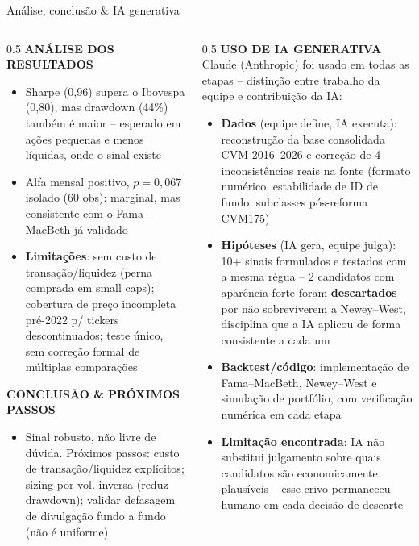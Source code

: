 \documentclass[aspectratio=169,9pt]{beamer}
\let\olditem\item
\renewcommand\item{\olditem\vspace{0.5pt}}
\newcommand{\crit}[1]{{\scriptsize\color{gold}\textbf{#1}}}
\begin{document}
\begin{frame}{Análise, conclusão \& IA generativa}{}
\begin{columns}[T]
\begin{column}{0.5\textwidth}
\crit{ANÁLISE DOS RESULTADOS}
\begin{itemize}
\item Sharpe (0,96) supera o Ibovespa (0,80), mas drawdown (44\%) também é
  maior -- esperado em ações pequenas e menos líquidas, onde o sinal existe
\item Alfa mensal positivo, $p=0{,}067$ isolado (60 obs): marginal, mas
  consistente com o Fama--MacBeth já validado
\item \textbf{Limitações}: sem custo de transação/liquidez (perna comprada em
  small caps); cobertura de preço incompleta pré-2022 p/ tickers
  descontinuados; teste único, sem correção formal de múltiplas comparações
\end{itemize}
\crit{CONCLUSÃO \& PRÓXIMOS PASSOS}
\begin{itemize}
\item Sinal robusto, não livre de dúvida. Próximos passos: custo de
  transação/liquidez explícitos; sizing por vol. inversa (reduz drawdown);
  validar defasagem de divulgação fundo a fundo (não é uniforme)
\end{itemize}
\end{column}
\begin{column}{0.5\textwidth}
\crit{USO DE IA GENERATIVA}\\[2pt]
\footnotesize Claude (Anthropic) foi usado em todas as etapas -- distinção
entre trabalho da equipe e contribuição da IA:
\begin{itemize}
\item \textbf{Dados} (equipe define, IA executa): reconstrução da base
  consolidada CVM 2016--2026 e correção de 4 inconsistências reais na fonte
  (formato numérico, estabilidade de ID de fundo, subclasses pós-reforma
  CVM175)
\item \textbf{Hipóteses} (IA gera, equipe julga): 10+ sinais formulados e
  testados com a mesma régua -- 2 candidatos com aparência forte foram
  \textbf{descartados} por não sobreviverem a Newey--West, disciplina que a
  IA aplicou de forma consistente a cada um
\item \textbf{Backtest/código}: implementação de Fama--MacBeth, Newey--West
  e simulação de portfólio, com verificação numérica em cada etapa
\item \textbf{Limitação encontrada}: IA não substitui julgamento sobre
  quais candidatos são economicamente plausíveis -- esse crivo permaneceu
  humano em cada decisão de descarte
\end{itemize}
\end{column}
\end{columns}
\end{frame}
\end{document}
